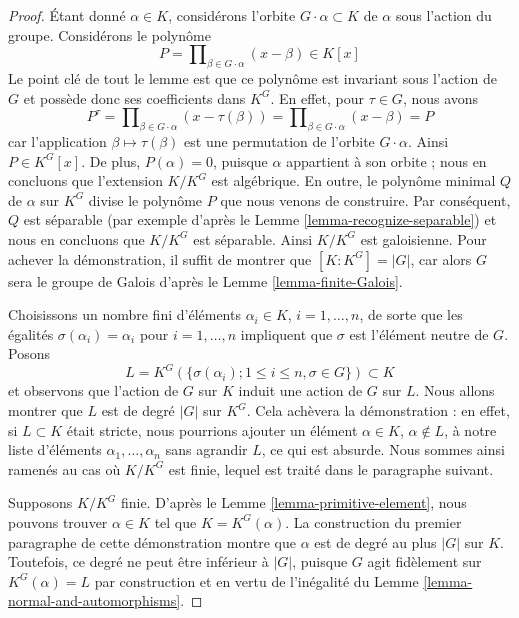 \begin{proof}
Étant donné $\alpha \in K$, considérons l'orbite $G \cdot \alpha \subset K$
de $\alpha$ sous l'action du groupe. Considérons le polynôme
$$
P = \prod\nolimits_{\beta \in G \cdot \alpha} (x - \beta) \in K[x]
$$
Le point clé de tout le lemme est que ce polynôme est invariant
sous l'action de $G$ et possède donc ses coefficients dans $K^G$.
En effet, pour $\tau \in G$, nous avons
$$
P^\tau = \prod\nolimits_{\beta \in G \cdot \alpha} (x - \tau(\beta)) =
\prod\nolimits_{\beta \in G \cdot \alpha} (x - \beta) = P
$$
car l'application $\beta \mapsto \tau(\beta)$ est une permutation de
l'orbite $G \cdot \alpha$. Ainsi $P \in K^G[x]$. De plus,
$P(\alpha) = 0$, puisque $\alpha$ appartient à son orbite ;
nous en concluons que l'extension $K/K^G$ est algébrique. En outre,
le polynôme minimal $Q$ de $\alpha$ sur $K^G$ divise le
polynôme $P$ que nous venons de construire. Par conséquent, $Q$ est séparable
(par exemple d'après le Lemme \ref{lemma-recognize-separable}) et
nous en concluons que $K/K^G$ est séparable. Ainsi $K/K^G$ est galoisienne.
Pour achever la démonstration, il suffit de montrer que $[K : K^G] = |G|$,
car alors $G$ sera le groupe de Galois d'après le
Lemme \ref{lemma-finite-Galois}.

\medskip\noindent
Choisissons un nombre fini d'éléments $\alpha_i \in K$, $i = 1, \ldots, n$,
de sorte que les égalités $\sigma(\alpha_i) = \alpha_i$ pour $i = 1, \ldots, n$ impliquent
que $\sigma$ est l'élément neutre de $G$. Posons
$$
L = K^G(\{\sigma(\alpha_i); 1 \leq i \leq n, \sigma \in G\}) \subset K
$$
et observons que l'action de $G$ sur $K$ induit une action de $G$ sur $L$.
Nous allons montrer que $L$ est de degré $|G|$ sur $K^G$. Cela achèvera la
démonstration : en effet, si $L \subset K$ était stricte, nous pourrions ajouter un élément
$\alpha \in K$, $\alpha \not \in L$, à notre liste d'éléments
$\alpha_1, \ldots, \alpha_n$ sans agrandir $L$, ce qui est absurde.
Nous sommes ainsi ramenés au cas où $K/K^G$ est finie, lequel est
traité dans le paragraphe suivant.

\medskip\noindent
Supposons $K/K^G$ finie. D'après le Lemme \ref{lemma-primitive-element},
nous pouvons trouver $\alpha \in K$ tel que $K = K^G(\alpha)$.
La construction du premier paragraphe de cette démonstration montre
que $\alpha$ est de degré au plus $|G|$ sur $K$. Toutefois, ce
degré ne peut être inférieur à $|G|$, puisque $G$ agit fidèlement sur
$K^G(\alpha) = L$ par construction et en vertu de l'inégalité du
Lemme \ref{lemma-normal-and-automorphisms}.
\end{proof}

